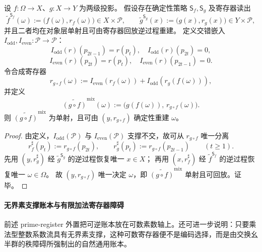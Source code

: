 \begin{theorem}[投影合成下的素数交错分配律]\label{thm:conclusion-prime-interleaving-composition-law}
设 \(f:\Omega\to X\)、\(g:X\to Y\) 为两级投影。
假设存在确定性策略 \(\mathsf S_f,\mathsf S_g\) 及寄存器读出
\[
\widetilde f^{\mathsf S_f}(\omega):=\bigl(f(\omega),r_f(\omega)\bigr)\in X\times\mathcal P,\qquad
\widetilde g^{\mathsf S_g}(x):=\bigl(g(x),r_g(x)\bigr)\in Y\times\mathcal P,
\]
并且二者均在对象层单射且可由寄存器回放逆过程重建。
定义交错嵌入 \(I_{\mathrm{odd}},I_{\mathrm{even}}:\mathcal P\to\mathcal P\)：
\[
I_{\mathrm{odd}}(r)(p_{2t-1})=r(p_t),\quad I_{\mathrm{odd}}(r)(p_{2t})=0,
\]
\[
I_{\mathrm{even}}(r)(p_{2t})=r(p_t),\quad I_{\mathrm{even}}(r)(p_{2t-1})=0.
\]
令合成寄存器
\[
r_{g\circ f}(\omega)
:=
I_{\mathrm{even}}(r_f(\omega))
+
I_{\mathrm{odd}}(r_g(f(\omega))),
\]
并定义
\[
\widetilde{(g\circ f)}^{\mathrm{mix}}(\omega)
:=
\bigl(g(f(\omega)),\,r_{g\circ f}(\omega)\bigr).
\]
则 \(\widetilde{(g\circ f)}^{\mathrm{mix}}\) 为单射，且可由 \((y,r_{g\circ f})\) 确定性重建 \(\omega\)。
\end{theorem}
\begin{proof}
由定义，\(I_{\mathrm{odd}}(\mathcal P)\) 与 \(I_{\mathrm{even}}(\mathcal P)\) 支撑不交，故可从 \(r_{g\circ f}\) 唯一分离
\[
r_f^\sharp(p_t):=r_{g\circ f}(p_{2t}),\qquad
r_g^\sharp(p_t):=r_{g\circ f}(p_{2t-1})\qquad (t\ge 1).
\]
先用 \((y,r_g^\sharp)\) 经 \(\widetilde g^{\mathsf S_g}\) 的逆过程恢复唯一 \(x\in X\)；
再用 \((x,r_f^\sharp)\) 经 \(\widetilde f^{\mathsf S_f}\) 的逆过程恢复唯一 \(\omega\in\Omega\)。
故 \((y,r_{g\circ f})\) 唯一决定 \(\omega\)，即 \(\widetilde{(g\circ f)}^{\mathrm{mix}}\) 单射且可回放。证毕。
\end{proof}

\paragraph{无界素支撑账本与有限加法寄存器障碍}
前述 prime-register 外置把可逆账本放在可数素数轴上。还可进一步说明：只要乘法型整数系数流具有无界素支撑，这种可数寄存器便不是编码选择，而是由交换幺半群的秩障碍所强制出的自然通用账本。

